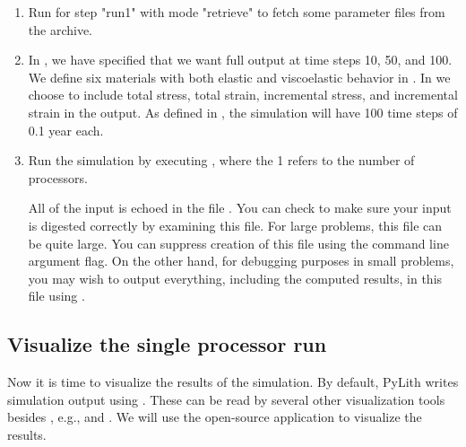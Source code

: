\begin{enumerate}
\item Run  for step "run1" with mode "retrieve" to
  fetch some parameter files from the archive.

  \begin{screen}
    \shellprompt{}
  \end{screen}
  
\item In , we have specified that we want
  full output at time steps 10, 50, and 100. We define six materials
  with both elastic and viscoelastic behavior in
  . In  we choose to
  include total stress, total strain, incremental stress, and
  incremental strain in the output. As defined in
  , the simulation will have 100 time steps of
  0.1 year each.
\item Run the simulation by executing , where
  the 1 refers to the number of processors.

  \begin{tip}
    All of the input is echoed in the file .
    You can check to make sure your input is digested correctly by
    examining this file. For large problems, this file can be quite
    large. You can suppress creation of this file using the command
    line argument  flag. On the
    other hand, for debugging purposes in small problems, you may wish
    to output everything, including the computed results, in this file
    using .
  \end{tip}
  
  \begin{screen}
    \shellprompt{}
  \end{screen}
\end{enumerate}

\subsection{Visualize the single processor run}

Now it is time to visualize the results of the simulation. By default,
PyLith writes simulation output using .
These can be read by several other visualization tools besides
, e.g.,  and . We will use the open-source application
 to visualize the results.
    
